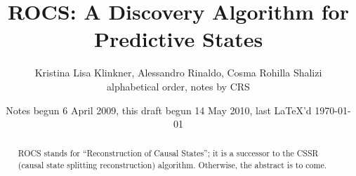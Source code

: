 \documentclass{article}
\begin{document}
\title{ROCS: A Discovery Algorithm for Predictive States}
\author{Kristina Lisa Klinkner, Alessandro Rinaldo, Cosma Rohilla Shalizi\\
{\small alphabetical order, notes by CRS}}
\date{Notes begun 6 April 2009, this draft begun 14 May 2010, last \LaTeX 'd \today}
\maketitle
\begin{abstract}
  ROCS stands for ``Reconstruction of Causal States''; it is a successor to the
  CSSR (causal state splitting reconstruction) algorithm.  Otherwise, the
  abstract is to come.
\end{abstract}

\tableofcontents
















\appendix


\end{document}

